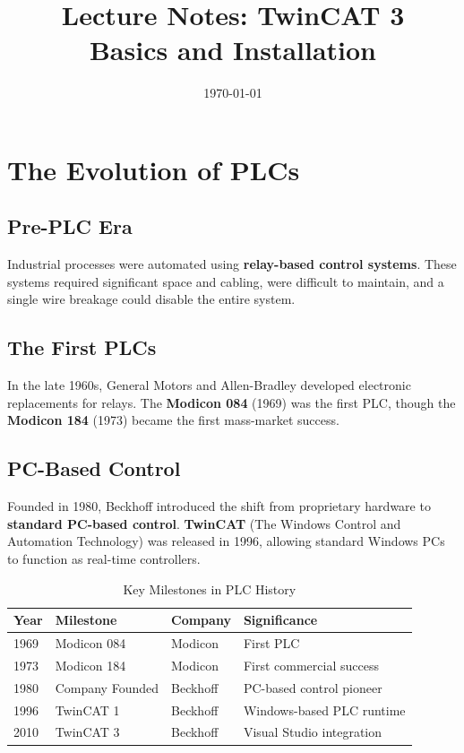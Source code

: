 \documentclass[11pt,a4paper]{article}
\title{
    \vspace{-1cm}
    \textbf{Lecture Notes: TwinCAT 3}\\
    \Large Basics and Installation
}
\author{}
\date{\today}
\begin{document}
\maketitle

\tableofcontents
\newpage

\section{The Evolution of PLCs}

\subsection{Pre-PLC Era}

Industrial processes were automated using \textbf{relay-based control systems}. These systems required significant space and cabling, were difficult to maintain, and a single wire breakage could disable the entire system.

\subsection{The First PLCs}

In the late 1960s, General Motors and Allen-Bradley developed electronic replacements for relays. The \textbf{Modicon 084} (1969) was the first PLC, though the \textbf{Modicon 184} (1973) became the first mass-market success.

\subsection{PC-Based Control}

Founded in 1980, Beckhoff introduced the shift from proprietary hardware to \textbf{standard PC-based control}. \textbf{TwinCAT} (The Windows Control and Automation Technology) was released in 1996, allowing standard Windows PCs to function as real-time controllers.

\begin{table}[h]
\centering
\begin{tabular}{@{}llll@{}}
\toprule
\textbf{Year} & \textbf{Milestone} & \textbf{Company} & \textbf{Significance} \\
\midrule
1969 & Modicon 084 & Modicon & First PLC \\
1973 & Modicon 184 & Modicon & First commercial success \\
1980 & Company Founded & Beckhoff & PC-based control pioneer \\
1996 & TwinCAT 1 & Beckhoff & Windows-based PLC runtime \\
2010 & TwinCAT 3 & Beckhoff & Visual Studio integration \\
\bottomrule
\end{tabular}
\caption{Key Milestones in PLC History}
\end{table}
\end{document}
